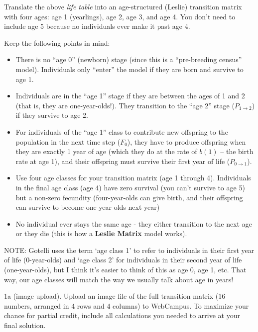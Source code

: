 \documentclass[
]{article}
\providecommand{\tightlist}{%
  \setlength{\itemsep}{0pt}\setlength{\parskip}{0pt}}
\begin{document}
Translate the above \emph{life table} into an age-structured (Leslie)
transition matrix with four ages: age 1 (yearlings), age 2, age 3, and
age 4. You don't need to include age 5 because no individuals ever make
it past age 4.

Keep the following points in mind:

\begin{itemize}
\tightlist
\item
  There is no ``age 0'' (newborn) stage (since this is a ``pre-breeding
  census'' model). Individuals only ``enter'' the model if they are born
  and survive to age 1.
\item
  Individuals are in the ``age 1'' stage if they are between the ages of
  1 and 2 (that is, they are one-year-olds!). They transition to the
  ``age 2'' stage (\(P_{1 \rightarrow 2}\)) if they survive to age 2.\\
\item
  For individuals of the ``age 1'' class to contribute new offspring to
  the population in the next time step (\(F_0\)), they have to produce
  offspring when they are exactly 1 year of age (which they do at the
  rate of \(b(1)\) -- the birth rate at age 1), and their offspring must
  survive their first year of life (\(P_{0 \rightarrow 1}\)).\\
\item
  Use four age classes for your transition matrix (age 1 through 4).
  Individuals in the final age class (age 4) have zero survival (you
  can't survive to age 5) but a non-zero fecundity (four-year-olds can
  give birth, and their offspring can survive to become one-year-olds
  next year)\\
\item
  No individual ever stays the same age - they either transition to the
  next age or they die (this is how a \textbf{Leslie Matrix} model
  works).
\end{itemize}

NOTE: Gotelli uses the term `age class 1' to refer to individuals in
their first year of life (0-year-olds) and `age class 2' for individuals
in their second year of life (one-year-olds), but I think it's easier to
think of this as age 0, age 1, etc. That way, our age classes will match
the way we usually talk about age in years!

1a (image upload). Upload an image file of the full transition matrix
(16 numbers, arranged in 4 rows and 4 columns) to WebCampus. To maximize
your chance for partial credit, include all calculations you needed to
arrive at your final solution.
\end{document}
